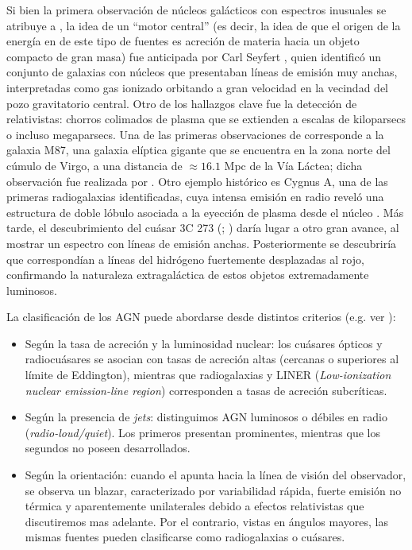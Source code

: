 	Si bien la primera observación de núcleos galácticos con espectros inusuales se atribuye a \cite{Fath1909}, la idea de un “motor central” (es decir, la idea de que el origen de la energía en de este tipo de fuentes es acreción de materia hacia un objeto compacto de gran masa) fue anticipada por Carl Seyfert \citep{Seyfert1943}, quien identificó un conjunto de galaxias con núcleos que presentaban líneas de emisión muy anchas, interpretadas como gas ionizado orbitando a gran velocidad en la vecindad del pozo gravitatorio central. 
	Otro de los hallazgos clave fue la detección de \jets relativistas: chorros colimados de plasma que se extienden a escalas de kiloparsecs o incluso megaparsecs.
	Una de las primeras observaciones de \jets corresponde a la galaxia M87, una galaxia elíptica gigante que se encuentra en la zona norte del cúmulo de Virgo, a una distancia de $\approx 16.1$ Mpc de la Vía Láctea; dicha observación fue realizada por \cite{Curtis1918}.
	Otro ejemplo histórico es Cygnus A, una de las primeras radiogalaxias identificadas, cuya intensa emisión en radio reveló una estructura de doble lóbulo asociada a la eyección de plasma desde el núcleo \citep{Jennison1953}.
	Más tarde, el descubrimiento del cuásar 3C 273 (\citealt{Hazard1963}; \citealt{Schmidt1963}) daría lugar a otro gran avance, al mostrar un espectro con líneas de emisión anchas. Posteriormente se descubriría que correspondían a líneas del hidrógeno fuertemente desplazadas al rojo, confirmando la naturaleza extragaláctica de estos objetos extremadamente luminosos.

	La clasificación de los AGN puede abordarse desde distintos criterios (e.g. ver \citealt{1995PASP..107..803U}):

\begin{itemize}
    \item Según la tasa de acreción y la luminosidad nuclear: los cuásares ópticos y radiocuásares se asocian con tasas de acreción altas (cercanas o superiores al límite de Eddington), mientras que radiogalaxias y LINER (\textit{Low-ionization nuclear emission-line region}) corresponden a tasas de acreción subcríticas.

\item Según la presencia de \textit{jets}: distinguimos AGN luminosos o débiles en radio (\textit{radio-loud/quiet}).
Los primeros presentan \jets prominentes, mientras que los segundos no poseen \jets desarrollados.

\item Según la orientación: cuando el \jet apunta hacia la línea de visión del observador, se observa un blazar, caracterizado por variabilidad rápida, fuerte emisión no térmica y \jets aparentemente unilaterales debido a efectos relativistas que discutiremos mas adelante.
Por el contrario, vistas en ángulos mayores, las mismas fuentes pueden clasificarse como radiogalaxias o cuásares.
\end{itemize}

